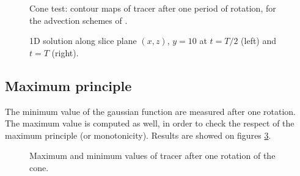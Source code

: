 \begin{figure}[H]
\begin{minipage}[t]{0.50\textwidth}
 \centering
\end{minipage}%
\begin{minipage}[t]{0.50\textwidth}
 \centering
\end{minipage}
\begin{minipage}[t]{0.50\textwidth}
 \centering
\end{minipage}%
\begin{minipage}[t]{0.50\textwidth}
 \centering
\end{minipage}
 \caption{Cone test: contour maps of tracer after one period of rotation, for the advection schemes of .}
 \label{t2d:cone:profiles2}
\end{figure}

\begin{figure}[H]
\begin{minipage}[t]{0.50\textwidth}
 \centering
\end{minipage}%
\begin{minipage}[t]{0.50\textwidth}
 \centering
\end{minipage}%
\caption{1D solution along slice plane $(x,z)$, $y=10$ at $t=T/2$ (left) and $t=T$ (right).}
\label{t2d:cone:1dslice}
\end{figure}

\newpage

\subsection{Maximum principle}

The minimum value of the gaussian function are measured after one rotation. 
The maximum value is computed as well, in order to check the respect of the maximum principle (or monotonicity). 
Results are showed on figures \ref{t2d:cone:minmax}.

\begin{figure}[H]
\centering
{}
\caption{Maximum and minimum values of tracer after one rotation of the cone.}
\label{t2d:cone:minmax}
\end{figure}

